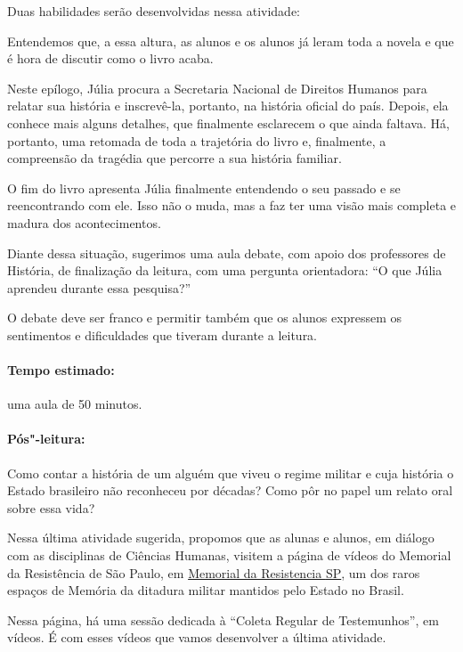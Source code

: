 \documentclass[12pt]{extarticle}
\begin{document}
Duas habilidades serão desenvolvidas nessa atividade:

Entendemos que, a essa altura, as alunos e os alunos já leram toda a
novela e que é hora de discutir como o livro acaba.

Neste epílogo, Júlia procura a Secretaria Nacional de Direitos Humanos
para relatar sua história e inscrevê-la, portanto, na história oficial
do país. Depois, ela conhece mais alguns detalhes, que finalmente
esclarecem o que ainda faltava. Há, portanto, uma retomada de toda a
trajetória do livro e, finalmente, a compreensão da tragédia que
percorre a sua história familiar.

O fim do livro apresenta Júlia finalmente entendendo o seu passado e se
reencontrando com ele. Isso não o muda, mas a faz ter uma visão mais
completa e madura dos acontecimentos.

Diante dessa situação, sugerimos uma aula debate, com apoio dos professores 
de História, de finalização da
leitura, com uma pergunta orientadora: ``O que Júlia aprendeu durante
essa pesquisa?''

O debate deve ser franco e permitir também que os alunos expressem os
sentimentos e dificuldades que tiveram durante a leitura.

\paragraph{Tempo estimado:} uma aula de 50 minutos.

\paragraph{Pós"-leitura:}

Como contar a história de um alguém que viveu o regime militar e cuja
história o Estado brasileiro não reconheceu por décadas? Como pôr no papel um relato oral sobre essa vida?

Nessa última atividade sugerida, propomos que as alunas e alunos, em diálogo com 
as disciplinas de Ciências Humanas, visitem
a página de vídeos do Memorial da Resistência de São Paulo, em
\href{http://memorialdaresistenciasp.org.br/acervo/}{Memorial da Resistencia \textsc{SP}}, um dos raros espaços de
Memória da ditadura militar mantidos pelo Estado no Brasil.



Nessa página, há uma sessão dedicada à ``Coleta Regular de
Testemunhos'', em vídeos. É com esses vídeos que vamos desenvolver a
última atividade.
\end{document}
